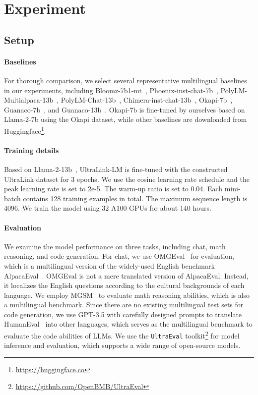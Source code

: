 \documentclass[11pt]{article}
\begin{document}
\section{Experiment}
\subsection{Setup}
\paragraph{Baselines} For thorough comparison, we select several representative multilingual baselines in our experiments, including Bloomz-7b1-mt~\cite{bloom}, Phoenix-inst-chat-7b~\cite{phoenix}, PolyLM-Multialpaca-13b~\cite{polylm}, PolyLM-Chat-13b~\cite{polylm}, Chimera-inst-chat-13b~\cite{phoenix}, Okapi-7b~\cite{okapi}, Guanaco-7b~\cite{Guanaco}, and Guanaco-13b~\cite{Guanaco}.
Okapi-7b is fine-tuned by ourselves based on Llama-2-7b using the Okapi dataset, while other baselines are downloaded from Huggingface\footnote{\url{https://huggingface.co}}.

\paragraph{Training details} Based on Llama-2-13b~\cite{llama}, UltraLink-LM is fine-tuned with the constructed UltraLink dataset for 3 epochs. We use the cosine learning rate schedule and the peak learning rate is set to 2e-5. The warm-up ratio is set to 0.04. Each mini-batch contains 128 training examples in total. The maximum sequence length is 4096. We train the model using 32 A100 GPUs for about 140 hours.

\paragraph{Evaluation} We examine the model performance on three tasks, including chat, math reasoning, and code generation. For chat, we use OMGEval~\cite{OMGEval} for evaluation, which is a multilingual version of the widely-used English benchmark  AlpacaEval~\cite{alpaca_eval}.
OMGEval is not a mere translated version of AlpacaEval. Instead, it localizes the English questions according to the cultural backgrounds of each language.
We employ MGSM~\cite{mgsm} to evaluate math reasoning abilities, which is also a multilingual benchmark.
Since there are no existing multilingual test sets for code generation, we use GPT-3.5 with carefully designed prompts to translate HumanEval~\cite{humaneval} into other languages, which serves as the multilingual benchmark to evaluate the code abilities of LLMs. We use the \texttt{UltraEval} toolkit\footnote{\url{https://github.com/OpenBMB/UltraEval}} for model inference and evaluation, which supports a wide range of open-source models.
\end{document}
